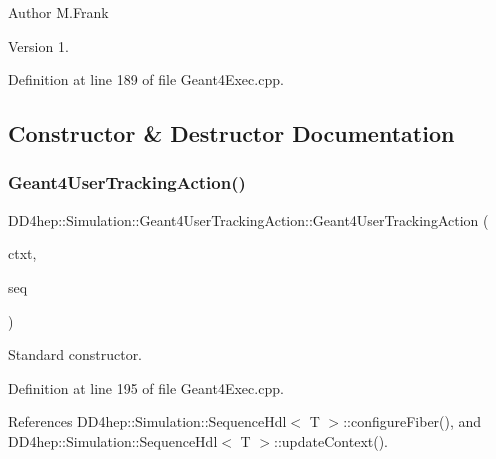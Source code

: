 \begin{DoxyAuthor}{Author}
M.\+Frank 
\end{DoxyAuthor}
\begin{DoxyVersion}{Version}
1. 
\end{DoxyVersion}


Definition at line 189 of file Geant4\+Exec.\+cpp.



\subsection{Constructor \& Destructor Documentation}
\hypertarget{class_d_d4hep_1_1_simulation_1_1_geant4_user_tracking_action_acee865c27f15ffd9f2d4c386f9ab7e8e}{}\label{class_d_d4hep_1_1_simulation_1_1_geant4_user_tracking_action_acee865c27f15ffd9f2d4c386f9ab7e8e} 
\subsubsection{\texorpdfstring{Geant4\+User\+Tracking\+Action()}{Geant4UserTrackingAction()}}
{\footnotesize\ttfamily D\+D4hep\+::\+Simulation\+::\+Geant4\+User\+Tracking\+Action\+::\+Geant4\+User\+Tracking\+Action (\begin{DoxyParamCaption}\item[{\hyperlink{class_d_d4hep_1_1_simulation_1_1_geant4_context}{Geant4\+Context} $\ast$}]{ctxt,  }\item[{\hyperlink{class_d_d4hep_1_1_simulation_1_1_geant4_tracking_action_sequence}{Geant4\+Tracking\+Action\+Sequence} $\ast$}]{seq }\end{DoxyParamCaption})\hspace{0.3cm}{\ttfamily [inline]}}



Standard constructor. 



Definition at line 195 of file Geant4\+Exec.\+cpp.



References D\+D4hep\+::\+Simulation\+::\+Sequence\+Hdl$<$ T $>$\+::configure\+Fiber(), and D\+D4hep\+::\+Simulation\+::\+Sequence\+Hdl$<$ T $>$\+::update\+Context().


